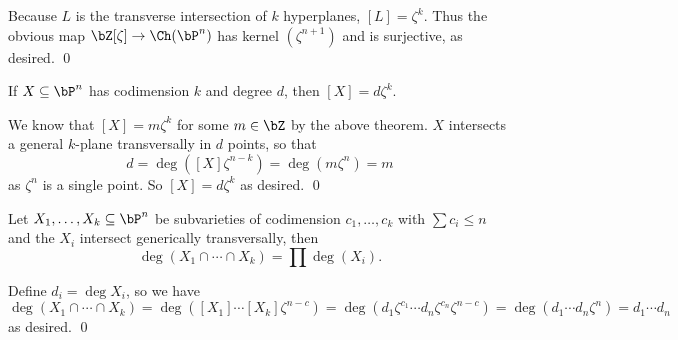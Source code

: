     Because $L$ is the transverse intersection of $k$ hyperplanes, $[L]=\zeta^k$.
    Thus the obvious map $\bZ[\zeta]\to\Ch(\bP^n)$ has kernel $(\zeta^{n+1})$ and is surjective, as desired.
    \qed

\eproof

\bcoro[name={projvarinchow}]

    If $X\subseteq\bP^n$ has codimension $k$ and degree $d$, then $[X]=d\zeta^k$.

\ecoro

\bproof

    We know that $[X]=m\zeta^k$ for some $m\in\bZ$ by the above theorem.
    $X$ intersects a general $k$-plane transversally in $d$ points, so that
    $$ d = \deg([X]\zeta^{n-k}) = \deg(m\zeta^n) = m $$
    as $\zeta^n$ is a single point.
    So $[X]=d\zeta^k$ as desired.
    \qed

\eproof

\bcoro[title={B\'ezout}]

    Let $X_1,\dots,X_k\subseteq\bP^n$ be subvarieties of codimension $c_1,\dots,c_k$ with $\sum c_i\leq n$ and the $X_i$ intersect
    generically transversally, then
    $$ \deg(X_1\cap\cdots\cap X_k) = \prod\deg(X_i) . $$

\ecoro

\bproof

    Define $d_i=\deg X_i$, so we have
    $$ \deg(X_1\cap\cdots\cap X_k) = \deg([X_1]\cdots[X_k]\zeta^{n-c}) =
    \deg(d_1\zeta^{c_1}\cdots d_n\zeta^{c_n}\zeta^{n-c}) = \deg(d_1\cdots d_n\zeta^n) = d_1\cdots d_n $$
    as desired.
    \qed

\eproof

